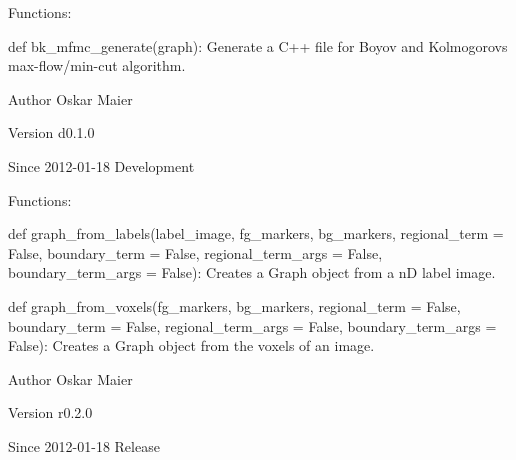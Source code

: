 Functions:
\begin{DoxyItemize}
\item def bk\_\-mfmc\_\-generate(graph): Generate a C++ file for Boyov and Kolmogorovs max-\/flow/min-\/cut algorithm.
\end{DoxyItemize}

\begin{DoxyAuthor}{Author}
Oskar Maier 
\end{DoxyAuthor}
\begin{DoxyVersion}{Version}
d0.1.0 
\end{DoxyVersion}
\begin{DoxySince}{Since}
2012-\/01-\/18  Development
\end{DoxySince}
Functions:
\begin{DoxyItemize}
\item def graph\_\-from\_\-labels(label\_\-image, fg\_\-markers, bg\_\-markers, regional\_\-term = False, boundary\_\-term = False, regional\_\-term\_\-args = False, boundary\_\-term\_\-args = False): Creates a Graph object from a nD label image.
\item def graph\_\-from\_\-voxels(fg\_\-markers, bg\_\-markers, regional\_\-term = False, boundary\_\-term = False, regional\_\-term\_\-args = False, boundary\_\-term\_\-args = False): Creates a Graph object from the voxels of an image. \begin{DoxyAuthor}{Author}
Oskar Maier 
\end{DoxyAuthor}
\begin{DoxyVersion}{Version}
r0.2.0 
\end{DoxyVersion}
\begin{DoxySince}{Since}
2012-\/01-\/18  Release 
\end{DoxySince}

\end{DoxyItemize}


